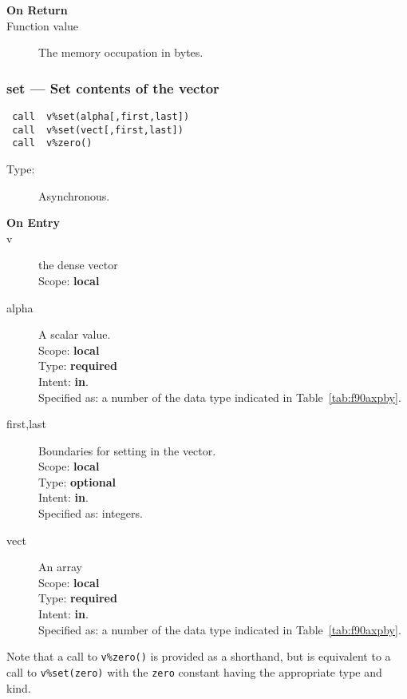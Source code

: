 \begin{description}
\item[\bf On Return]
\item[Function value] The memory occupation in bytes.
\end{description}


\subsubsection*{set  --- Set contents of the vector}

\begin{verbatim}
 call  v%set(alpha[,first,last])
 call  v%set(vect[,first,last])
 call  v%zero()
\end{verbatim}

\begin{description}
\item[Type:] Asynchronous.
\item[\bf On Entry]
\item[v] the dense vector\\
Scope: {\bf local}\\
\item[alpha] A scalar value. \\ Scope: {\bf local} \\ Type: {\bf
required} \\ Intent: {\bf in}.\\ Specified as: a number of the data
type indicated in Table~\ref{tab:f90axpby}.

\item[first,last] Boundaries for setting in the vector.\\ Scope: {\bf
    local} \\ Type: {\bf optional} \\ Intent: {\bf in}.\\ Specified
  as: integers.
\item[vect] An  array \\ Scope: {\bf local} \\ Type: {\bf
required} \\ Intent: {\bf in}.\\ Specified as: a number of the data
type indicated in Table~\ref{tab:f90axpby}.
\end{description}
Note that a call to \verb|v%zero()| is provided as a shorthand, but
is equivalent to a call to \verb|v%set(zero)| with  the \verb|zero|
constant having the appropriate type and kind.

